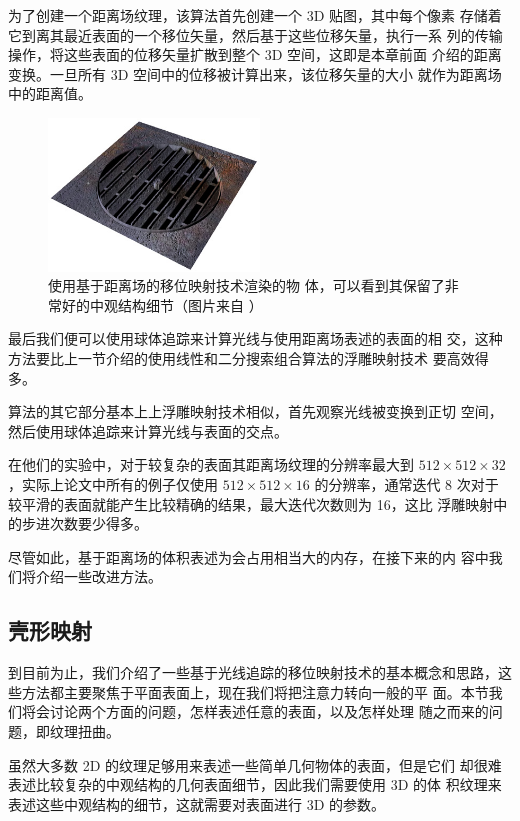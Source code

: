为了创建一个距离场纹理，该算法首先创建一个 3D 贴图，其中每个像素 存储着它到离其最近表面的一个移位矢量，然后基于这些位移矢量，执行一系 列的传输操作，将这些表面的位移矢量扩散到整个 3D 空间，这即是本章前面 介绍的距离变换。一旦所有 3D 空间中的位移被计算出来，该位移矢量的大小 就作为距离场中的距离值。

\begin{figure}
	\sidecaption
	\includegraphics[width=0.5\textwidth]{figures/df/08_displacement_06}
	\caption{使用基于距离场的移位映射技术渲染的物 体，可以看到其保留了非常好的中观结构细节（图片来自 \cite{a:Per-PixelDisplacementMappingwithDistanceFunctions}）}
	\label{f:df-08_displacement_06}
\end{figure}

最后我们便可以使用球体追踪来计算光线与使用距离场表述的表面的相 交，这种方法要比上一节介绍的使用线性和二分搜索组合算法的浮雕映射技术 要高效得多。

算法的其它部分基本上上浮雕映射技术相似，首先观察光线被变换到正切 空间，然后使用球体追踪来计算光线与表面的交点。

在他们的实验中，对于较复杂的表面其距离场纹理的分辨率最大到 $512\times 512\times 32$，实际上论文中所有的例子仅使用 $512\times 512\times 16$ 的分辨率，通常迭代 8 次对于较平滑的表面就能产生比较精确的结果，最大迭代次数则为 16，这比 浮雕映射中的步进次数要少得多。

尽管如此，基于距离场的体积表述为会占用相当大的内存，在接下来的内 容中我们将介绍一些改进方法。




\subsection{壳形映射}
到目前为止，我们介绍了一些基于光线追踪的移位映射技术的基本概念和思路，这些方法都主要聚焦于平面表面上，现在我们将把注意力转向一般的平 面。本节我们将会讨论两个方面的问题，怎样表述任意的表面，以及怎样处理 随之而来的问题，即纹理扭曲。

虽然大多数 2D 的纹理足够用来表述一些简单几何物体的表面，但是它们 却很难表述比较复杂的中观结构的几何表面细节，因此我们需要使用 3D 的体 积纹理来表述这些中观结构的细节，这就需要对表面进行 3D 的参数。

